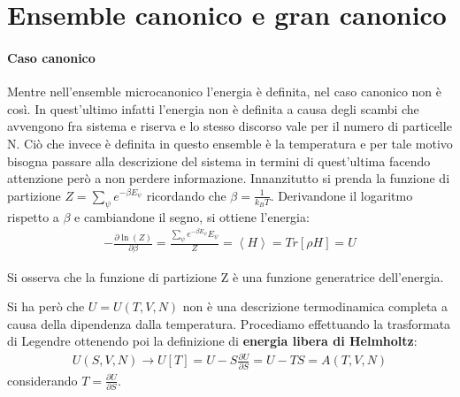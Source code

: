 


%
\section{Ensemble canonico e gran canonico} %
\paragraph{Caso canonico} %
Mentre nell'ensemble microcanonico l'energia è definita, nel caso canonico non è così. In quest'ultimo infatti l'energia non è definita a causa degli scambi che avvengono fra sistema e riserva e lo stesso discorso vale per il numero di particelle N. Ciò che invece è definita in questo ensemble è la temperatura e per tale motivo bisogna passare alla descrizione del sistema in termini di quest'ultima facendo attenzione però a non perdere informazione.
Innanzitutto si prenda la funzione di partizione $Z=\sum_{\psi }{e^{-\beta E_\psi }}$ ricordando che $\beta=\frac{1}{k_BT}$. Derivandone il logaritmo rispetto a $\beta$ e cambiandone il segno, si ottiene l'energia:
\begin{equation}\begin{split}
-\frac{\partial \ln{\left(Z\right)}}{\partial \beta}=\frac{\sum_{\psi }{e^{-\beta E_\psi }E_\psi }}{Z}=\left\langle H \right\rangle=Tr\left[\rho H\right]=U
\end{split}\end{equation}

Si osserva che la funzione di partizione Z è una funzione generatrice dell'energia.

Si ha però che $U=U\left(T,V,N\right)$ non è una descrizione termodinamica completa a causa della dipendenza dalla temperatura. 
Procediamo effettuando la trasformata di Legendre ottenendo poi la definizione di \textbf{energia libera di Helmholtz}:
\begin{equation}\begin{split}
U\left(S,V,N\right)\longrightarrow U\left[T\right]=U-S\frac{\partial U}{\partial S}=U-TS=A\left(T,V,N\right)
\end{split}\end{equation}
considerando $T=\frac{\partial U}{\partial S}$.

